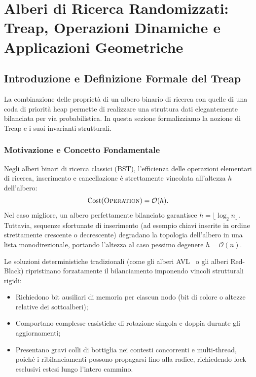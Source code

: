 \chapter{Alberi di Ricerca Randomizzati: Treap, Operazioni Dinamiche e Applicazioni Geometriche}
\label{chap:randomized-search-trees-treaps}

\FloatBarrier
\section{Introduzione e Definizione Formale del Treap}
\label{sec:treap-definition-and-foundations}

La combinazione delle propriet\`a di un albero binario di ricerca con quelle di una coda di priorit\`a heap permette di realizzare una struttura dati elegantemente bilanciata per via probabilistica. In questa sezione formalizziamo la nozione di Treap e i suoi invarianti strutturali.

\FloatBarrier
\subsection{Motivazione e Concetto Fondamentale}
Negli alberi binari di ricerca classici (BST), l'efficienza delle operazioni elementari di ricerca, inserimento e cancellazione \`e strettamente vincolata all'altezza $h$ dell'albero:
\begin{equation}
  \operatorname{Cost}(\textsc{Operation}) = \mathcal{O}(h).
\end{equation}
Nel caso migliore, un albero perfettamente bilanciato garantisce $h = \lfloor \log_2 n \rfloor$. Tuttavia, sequenze sfortunate di inserimento (ad esempio chiavi inserite in ordine strettamente crescente o decrescente) degradano la topologia dell'albero in una lista monodirezionale, portando l'altezza al caso pessimo degenere $h = \mathcal{O}(n)$.

Le soluzioni deterministiche tradizionali (come gli alberi AVL~\cite{knuth1997} o gli alberi Red-Black) ripristinano forzatamente il bilanciamento imponendo vincoli strutturali rigidi:
\begin{itemize}
    \item Richiedono bit ausiliari di memoria per ciascun nodo (bit di colore o altezze relative dei sottoalberi);
    \item Comportano complesse casistiche di rotazione singola e doppia durante gli aggiornamenti;
    \item Presentano gravi colli di bottiglia nei contesti concorrenti e multi-thread, poich\'e i ribilanciamenti possono propagarsi fino alla radice, richiedendo lock esclusivi estesi lungo l'intero cammino.
\end{itemize}

